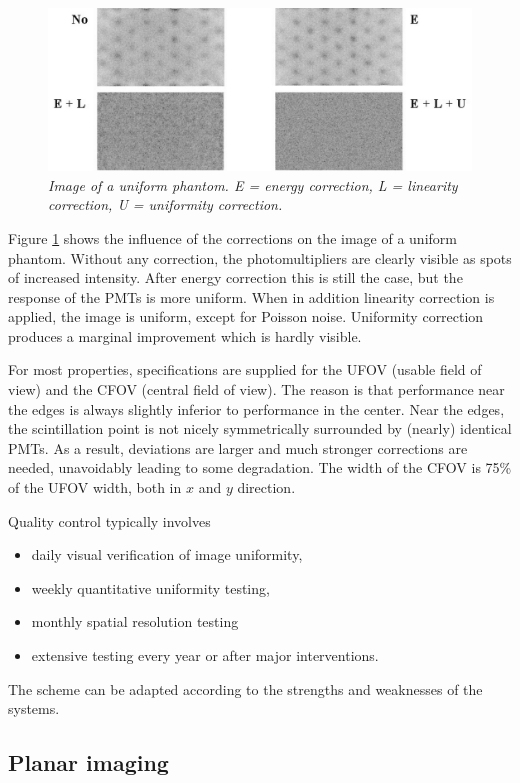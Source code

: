 \begin{figure}[tb]
\centering
\includegraphics[width=\figbig]{figs/fig_en_lin_unif.pdf}
\caption{\label{fig:en_lin_unif} \emph{Image of a uniform phantom. E = energy
correction, L = linearity correction, U = uniformity correction.}}
\end{figure}
%
Figure \ref{fig:en_lin_unif} shows the influence of the corrections on the
image of a uniform phantom. Without any correction, the photomultipliers are
clearly visible as spots of increased intensity. After energy correction this
is still the case, but the response of the PMTs is more uniform. When in
addition linearity correction is applied, the image is uniform, except for
Poisson noise. Uniformity correction produces a marginal improvement which is
hardly visible.

For most properties, specifications are supplied for the UFOV (usable field of
view) and the CFOV (central field of view). The reason is that performance
near the edges is always slightly inferior to performance in the center. Near
the edges, the scintillation point is not nicely symmetrically surrounded by
(nearly) identical PMTs. As a result, deviations are larger and much stronger
corrections are needed, unavoidably leading to some degradation. The width of
the CFOV is 75\% of the UFOV width, both in $x$ and $y$ direction. 

Quality control typically involves
\begin{itemize}
  \item daily visual verification of image uniformity,
  \item weekly quantitative uniformity testing,
  \item monthly spatial resolution testing
  \item extensive testing every year or after major interventions.
\end{itemize}
The scheme can be adapted according to the strengths and weaknesses of the
systems.


\subsection{Planar imaging}
